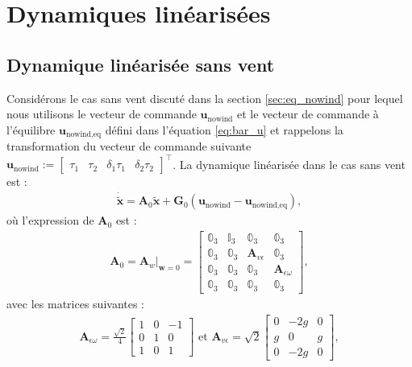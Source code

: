 \section{Dynamiques linéarisées}
\subsection{Dynamique linéarisée sans vent}
\label{sec:nowind_lin}
Considérons le cas sans vent discuté dans la section \ref{sec:eq_nowind} pour lequel nous utilisons le vecteur de commande $\boldsymbol{u}_{\text{nowind}}$  et le vecteur de commande à l'équilibre $\boldsymbol{u}_{\text{nowind},\text{eq}}$ défini dans l'équation \eqref{eq:bar_u} et rappelons la transformation du vecteur de commande suivante $ \boldsymbol{u}_{\text{nowind}} := \begin{bmatrix}\tau_{1}  \!&\! \tau_{2}  \!&\! \delta_{1}\tau_{1} \!&\! \delta_{2}\tau_{2} \end{bmatrix}^\top$. La dynamique linéarisée dans le cas sans vent est :
\begin{align}
    \label{eq:linearized}
     \boldsymbol{\dot{\tilde{x}}} = \boldsymbol{A}_{0} \tilde{\boldsymbol{x}} + \boldsymbol{G}_{0} (\boldsymbol{u}_{\text{nowind}}-\boldsymbol{u}_{\text{nowind},\text{eq}}),
\end{align}
où l'expression de $\boldsymbol{A}_{0}$ est : 
\begin{align}
    \label{matrice_A}
        \boldsymbol{A}_{0} = \boldsymbol{A}_{w} \Big|_{\boldsymbol{w}=0} =\begin{bmatrix}
        \mathbb{0}_{3} & \mathbb{I}_{3} & \mathbb{0}_{3} & \mathbb{0}_{3} \\
        \mathbb{0}_{3} & \mathbb{0}_{3} &  \boldsymbol{A}_{v\epsilon} & \mathbb{0}_{3} \\
        \mathbb{0}_{3} & \mathbb{0}_{3} & \mathbb{0}_{3} & \boldsymbol{A}_{\epsilon\omega} \\
        \mathbb{0}_{3} & \mathbb{0}_{3} & \mathbb{0}_{3} & \mathbb{0}_{3}
        \end{bmatrix},
\end{align}
avec les matrices suivantes : 
\begin{align*}
    \boldsymbol{A}_{\epsilon\omega} = \frac{\sqrt{2}}{4}\begin{bmatrix} 
        1 & 0 & -1 \\ 
        0 & 1 & 0  \\
       1 & 0 & 1
    \end{bmatrix} \text{ et } \boldsymbol{A}_{ v\epsilon} = \sqrt{2}\begin{bmatrix} 
        0 & -2g & 0\\
        g & 0 & g  \\ 
         0 & -2g & 0 \end{bmatrix},
\end{align*}

